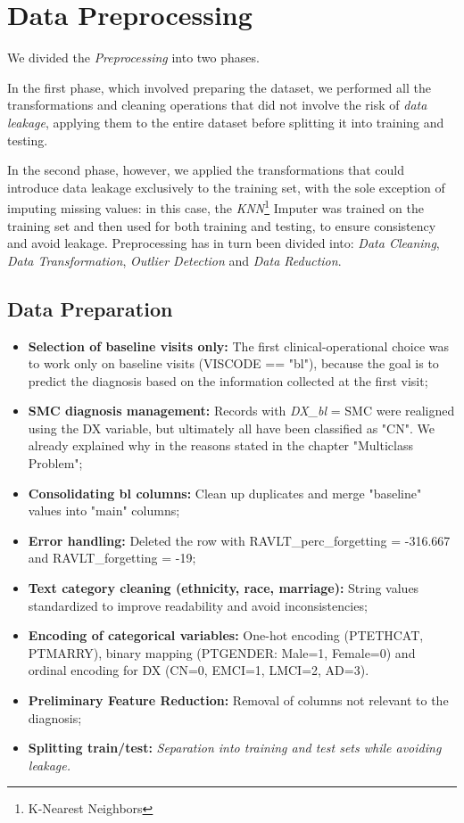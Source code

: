 \section{Data Preprocessing}
We divided the \textit{Preprocessing} into two phases. 

In the first phase, which involved preparing the dataset, we performed all the transformations and cleaning operations that did not involve the risk of \textit{data leakage}, applying them to the entire dataset before splitting it into training and testing. 

In the second phase, however, we applied the transformations that could introduce data leakage exclusively to the training set, with the sole exception of imputing missing values: in this case, the \textit{KNN}\footnote{K-Nearest Neighbors} Imputer was trained on the training set and then used for both training and testing, to ensure consistency and avoid leakage. Preprocessing has in turn been divided into: \textit{Data Cleaning}, \textit{Data Transformation}, \textit{Outlier Detection} and \textit{Data Reduction}. 

\subsection{Data Preparation}
\begin{itemize}
	\item \textbf{Selection of baseline visits only:} The first clinical-operational choice was to work only on baseline visits (VISCODE == "bl"), because the goal is to predict the diagnosis based on the information collected at the first visit; 
	\item \textbf{SMC diagnosis management:} Records with \textit{DX\_bl} = SMC were realigned using the DX variable, but ultimately all have been classified as "CN". We already explained why in the reasons stated in the chapter "Multiclass Problem"; 
	\item \textbf{Consolidating bl columns:} Clean up duplicates and merge "baseline" values into "main" columns;
	\item \textbf{Error handling:} Deleted the row with RAVLT\_perc\_forgetting = -316.667 and RAVLT\_forgetting = -19;
	\item \textbf{Text category cleaning (ethnicity, race, marriage):} String values standardized to improve readability and avoid inconsistencies;
	\item \textbf{Encoding of categorical variables:} One-hot encoding (PTETHCAT, PTMARRY), binary mapping (PTGENDER: Male=1, Female=0) and ordinal encoding for DX (CN=0, EMCI=1, LMCI=2, AD=3).
	\item \textbf{Preliminary Feature Reduction:} Removal of columns not relevant to the diagnosis;
	\item \textbf{Splitting train/test:} \textit{Separation into training and test sets while avoiding leakage.}
\end{itemize}

